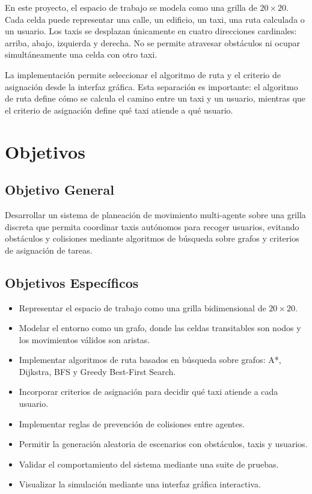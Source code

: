\documentclass[12pt,a4paper]{article}
\begin{document}
En este proyecto, el espacio de trabajo se modela como una grilla de $20 \times 20$. Cada celda puede representar una calle, un edificio, un taxi, una ruta calculada o un usuario. Los taxis se desplazan únicamente en cuatro direcciones cardinales: arriba, abajo, izquierda y derecha. No se permite atravesar obstáculos ni ocupar simultáneamente una celda con otro taxi.

La implementación permite seleccionar el algoritmo de ruta y el criterio de asignación desde la interfaz gráfica. Esta separación es importante: el algoritmo de ruta define cómo se calcula el camino entre un taxi y un usuario, mientras que el criterio de asignación define qué taxi atiende a qué usuario.

\section{Objetivos}

\subsection{Objetivo General}

Desarrollar un sistema de planeación de movimiento multi-agente sobre una grilla discreta que permita coordinar taxis autónomos para recoger usuarios, evitando obstáculos y colisiones mediante algoritmos de búsqueda sobre grafos y criterios de asignación de tareas.

\subsection{Objetivos Específicos}

\begin{itemize}
    \item Representar el espacio de trabajo como una grilla bidimensional de $20 \times 20$.
    \item Modelar el entorno como un grafo, donde las celdas transitables son nodos y los movimientos válidos son aristas.
    \item Implementar algoritmos de ruta basados en búsqueda sobre grafos: A*, Dijkstra, BFS y Greedy Best-First Search.
    \item Incorporar criterios de asignación para decidir qué taxi atiende a cada usuario.
    \item Implementar reglas de prevención de colisiones entre agentes.
    \item Permitir la generación aleatoria de escenarios con obstáculos, taxis y usuarios.
    \item Validar el comportamiento del sistema mediante una suite de pruebas.
    \item Visualizar la simulación mediante una interfaz gráfica interactiva.
\end{itemize}
\end{document}
